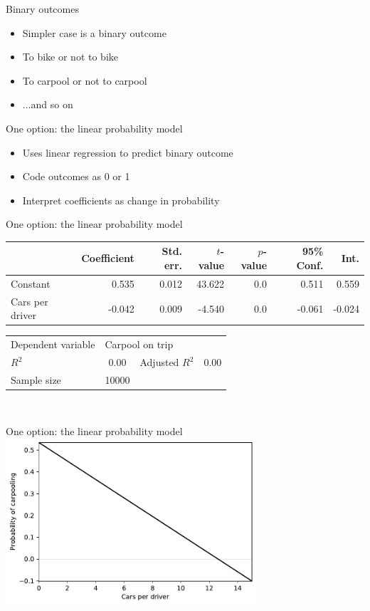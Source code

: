 \begin{frame}{Binary outcomes}
  \begin{itemize}
    \item Simpler case is a binary outcome
    \item To bike or not to bike
    \item To carpool or not to carpool
    \item ...and so on
  \end{itemize}
\end{frame}

\begin{frame}{One option: the linear probability model}
    \begin{itemize}
      \item Uses linear regression to predict binary outcome
      \item Code outcomes as 0 or 1
      \item Interpret coefficients as change in probability
    \end{itemize}
\end{frame}

\begin{frame}{One option: the linear probability model}
  \centering\begin{tabular}{lrrrrrr}
  \toprule
  {} &  Coefficient &  Std. err. &  $t$-value &  $p$-value &  95\% Conf. &   Int. \\
  \midrule
  Constant        &        0.535 &      0.012 &     43.622 &        0.0 &      0.511 &  0.559 \\
  Cars per driver &       -0.042 &      0.009 &     -4.540 &        0.0 &     -0.061 & -0.024 \\
  \bottomrule
  \end{tabular}
  \begin{tabular}{lclc}
  Dependent variable & \multicolumn{3}{l}{Carpool on trip} \\
  $R^2$ & 0.00 & Adjusted $R^2$ & 0.00 \\
  Sample size & 10000 && \\
  \end{tabular}\\
  \tiny\citenhts
\end{frame}

\begin{frame}{One option: the linear probability model}
  \centering\includegraphics[width=0.7\textwidth]{fig/linearprobabilitymodel.pdf}\\
  \tiny\citenhts
\end{frame}

